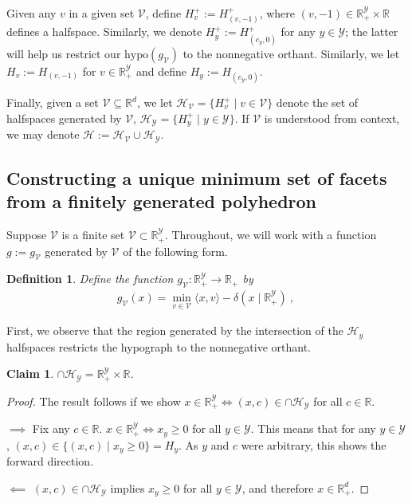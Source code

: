 \documentclass[11pt]{article}
\newcommand{\reals}{\mathbb{R}}
\renewcommand{\H}{\mathcal{H}}
\newcommand{\V}{\mathcal{V}}
\newcommand{\Y}{\mathcal{Y}}
\newcommand{\inprod}[2]{\langle #1, #2 \rangle}%
\newcommand{\hyp}{\mathrm{hypo}}
\newtheorem{claim}{Claim}
\newtheorem{definition}{Definition}
\begin{document}
Given any $v$ in a given set $\V$, define $H^+_v := H^+_{(v, -1)}$, where $(v, -1)\in\reals^\Y_+\times\reals$ defines a halfspace.
Similarly, we denote $H_y^+ := H_{(e_y, 0)}^+$ for any $y \in \Y$; the latter will help us restrict our $\hyp(g_\V)$ to the nonnegative orthant. 
Similarly, we let $H_v := H_{(v,-1)}$ for $v \in \reals^\Y_+$ and define $H_y := H_{(e_y, 0)}$. 

Finally, given a set $\V \subseteq \reals^d$, we let $\H_{\V} = \{H_v^+ \mid v\in\V\}$ denote the set of halfspaces generated by $\V$, $\H_\Y = \{H_y^+ \mid y\in\Y\}$.
If $\V$ is understood from context, we may denote $\H := \H_\V \cup\H_\Y$.


\subsection{Constructing a unique minimum set of facets from a finitely generated polyhedron}\label{appsubsec:phase1}
Suppose $\V$ is a finite set $\V \subset \reals_+^\Y$.
Throughout, we will work with a function $g := g_\V$ generated by $\V$ of the following form.

\begin{definition}\label{def:g-finite}
  Define the function $g_\V : \reals_+^\Y \to \reals_+$ by
  \begin{align*}
    g_\V(x) = \min_{v\in\V} \inprod{x}{v} - \delta(x \mid \reals_+^\Y)~,~
  \end{align*}
\end{definition}



First, we observe that the region generated by the intersection of the $\H_y$ halfspaces restricts the hypograph to the nonnegative orthant.
\begin{claim}\label{claim:x-nonneg-orthant-iff-intersection-HY}
  $\cap \H_\Y = \reals^\Y_+ \times \reals$.
\end{claim}
\begin{proof}
  The result follows if we show $x \in \reals^\Y_+ \iff (x,c) \in \cap \H_\Y$ for all $c \in \reals$.

  $\implies$
  Fix any $c \in \reals$.
  $x \in \reals^\Y_+ \iff x_y \geq 0$ for all $y \in \Y$.
  This means that for any $y \in \Y$, $(x,c) \in \{(x,c) \mid x_y \geq 0\} = H_y$.
  As $y$ and $c$ were arbitrary, this shows the forward direction.
  
  $\impliedby$
  $(x,c) \in \cap \H_\Y$ implies $x_y \geq 0$ for all $y \in \Y$, and therefore $x \in \reals^d_+$.	
\end{proof}
\end{document}
